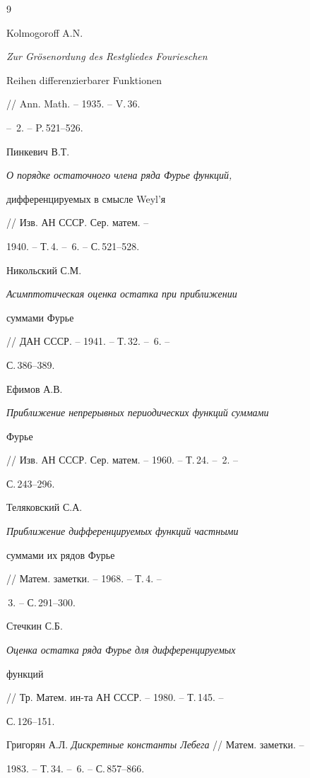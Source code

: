 \begin{thebibliography}{9} 


 




Kolmogoroff A.N. {\em Zur Gr\"osenordung des Restgliedes Fourieschen 


Reihen differenzierbarer Funk\-tionen} // Ann. Math. -- 1935. -- V.\,36. 


-- \No\,2. -- P.\,521--526. 




Пинкевич В.Т. {\em О порядке остаточного члена ряда Фурье функций, 


дифференцируемых в смысле Weyl'я} // Изв. АН СССР. Сер. матем. -- 


1940. -- Т.\,4. -- \No\,6. -- С.\,521--528. 




Никольский С.М. {\em Асимптотическая оценка остатка при приближении 


суммами Фурье} // ДАН СССР. -- 1941. -- Т.\,32. -- \No\,6. -- 


С.\,386--389. 




Ефимов А.В. {\em Приближение непрерывных периодических функций суммами 


Фурье} // Изв. АН СССР. Сер. матем. -- 1960. -- Т.\,24. -- \No\,2. -- 


С.\,243--296. 




Теляковский С.А. {\em Приближение дифференцируемых функций частными 


суммами их рядов Фурье} // Матем. заметки. -- 1968. -- Т.\,4. -- 


\No\,3. -- С.\,291--300. 




Стечкин С.Б. {\em Оценка остатка ряда Фурье для дифференцируемых 


функций} // Тр. Матем. ин-та АН СССР. -- 1980. -- Т.\,145. -- 


С.\,126--151. 




Григорян А.Л. {\em Дискретные константы Лебега} // Матем. заметки. -- 


1983. -- Т.\,34. -- \No\,6. -- С.\,857--866. 


 


 


\end{thebibliography} 


 


\vskip 2cm 


 








 


\label{end} 


 



